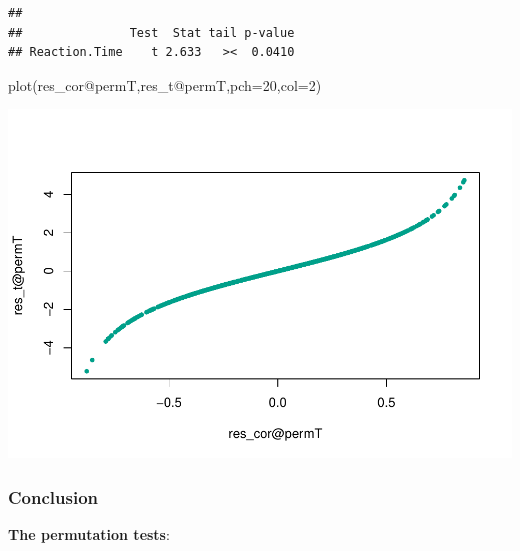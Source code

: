 \documentclass[
]{article}
\newenvironment{Shaded}{\begin{snugshade}}{\end{snugshade}}
\newcommand{\AttributeTok}[1]{\textcolor[rgb]{0.77,0.63,0.00}{#1}}
\newcommand{\DecValTok}[1]{\textcolor[rgb]{0.00,0.00,0.81}{#1}}
\newcommand{\FunctionTok}[1]{\textcolor[rgb]{0.00,0.00,0.00}{#1}}
\newcommand{\NormalTok}[1]{#1}
\newcommand{\SpecialCharTok}[1]{\textcolor[rgb]{0.00,0.00,0.00}{#1}}
\begin{document}
\begin{verbatim}
## 
##               Test  Stat tail p-value
## Reaction.Time    t 2.633   ><  0.0410
\end{verbatim}

\begin{Shaded}
\begin{Highlighting}[]
\FunctionTok{plot}\NormalTok{(res\_cor}\SpecialCharTok{@}\NormalTok{permT,res\_t}\SpecialCharTok{@}\NormalTok{permT,}\AttributeTok{pch=}\DecValTok{20}\NormalTok{,}\AttributeTok{col=}\DecValTok{2}\NormalTok{)}
\end{Highlighting}
\end{Shaded}

\begin{center}\includegraphics{perm_files/figure-latex/unnamed-chunk-20-1} \end{center}

\hypertarget{conclusion}{%
\subsubsection{Conclusion}\label{conclusion}}

\textbf{The permutation tests}:
\end{document}
